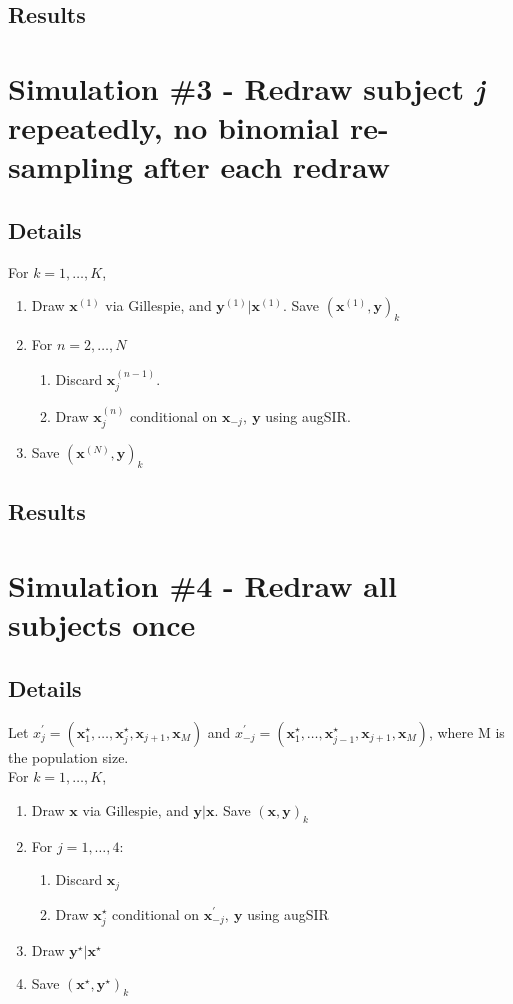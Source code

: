 \documentclass[11pt]{article}
\newcommand{\bx}{\mathbf{x}}
\newcommand{\by}{\mathbf{y}}
\begin{document}
\subsection*{Results}

\newpage
\section*{Simulation \#3 - Redraw subject \textit{j} repeatedly, no binomial re-sampling after each redraw}
\subsection*{Details}
For $ k = 1,\dots,K $,
\begin{enumerate}
	\item Draw $ \bx^{(1)} $ via Gillespie, and $ \by^{(1)}|\bx^{(1)} $. Save $ (\bx^{(1)}, \by)_{k} $
	\item For $ n = 2,\dots,N $
	\begin{enumerate}
		\item Discard $ \bx_j^{(n-1)} $.
		\item Draw $ \bx_j^{(n)} $ conditional on $ \bx_{-j},\ \by $ using augSIR.
	\end{enumerate} 
	\item Save $ (\bx^{(N)}, \by)_{k} $
\end{enumerate}

\subsection*{Results}

\newpage
\section*{Simulation \#4 - Redraw all subjects once}
\subsection*{Details}
Let $ x_j^\prime = (\bx_1^\star,\dots,\bx_{j}^\star,\bx_{j+1},\bx_{M})$ and $ x_{-j}^\prime = (\bx_1^\star,\dots,\bx_{j-1}^\star,\bx_{j+1},\bx_{M})$, where M is the population size.\\ For $ k = 1,\dots,K $,
\begin{enumerate}
	\item Draw $ \bx $ via Gillespie, and $ \by|\bx $. Save $ (\bx, \by)_{k} $
	\item For $ j = 1,\dots,4 $:
	\begin{enumerate}
		\item Discard $ \bx_j $
		\item Draw $ \bx_j^{\star} $ conditional on $ \bx_{-j}^\prime,\ \by $ using augSIR
	\end{enumerate} 
	\item Draw $ \by^\star|\bx^\star $
	\item Save $ (\bx^\star, \by^\star)_{k} $
\end{enumerate}
\end{document}
